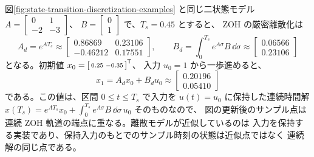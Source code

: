 図\ref{fig:state-transition-discretization-examples} と同じ二状態モデル
$A=\left[\begin{smallmatrix}0&1\\-2&-3\end{smallmatrix}\right]$、
$B=\left[\begin{smallmatrix}0\\1\end{smallmatrix}\right]$ で、$T_s=0.45$ とすると、
ZOH の厳密離散化は
\begin{equation}
  A_d=e^{AT_s}\approx
  \begin{bmatrix}
    0.86869&0.23106\\
    -0.46212&0.17551
  \end{bmatrix},\qquad
  B_d=\int_0^{T_s}e^{A\sigma}B\,\dd\sigma\approx
  \begin{bmatrix}
    0.06566\\
    0.23106
  \end{bmatrix}
\end{equation}
となる。初期値
$x_0=\left[\begin{smallmatrix}0.25&-0.35\end{smallmatrix}\right]^{\mathsf{T}}$、
入力 $u_0=1$ から一歩進めると、
\begin{equation}
  x_1=A_dx_0+B_du_0\approx
  \begin{bmatrix}
    0.20196\\
    0.05410
  \end{bmatrix}
\end{equation}
である。この値は、区間 $0\leq t\leq T_s$ で入力を $u(t)=u_0$ に保持した連続時間解
$x(T_s)=e^{AT_s}x_0+\int_0^{T_s}e^{A\sigma}B\,\dd\sigma\,u_0$ そのものなので、
図の更新後のサンプル点は連続 ZOH 軌道の端点に重なる。離散モデルが近似しているのは
入力を保持する実装であり、保持入力のもとでのサンプル時刻の状態は近似点ではなく
連続解の同じ点である。

